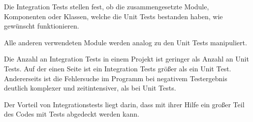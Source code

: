 
Die Integration Tests stellen fest, ob die zusammengesetzte Module, Komponenten oder Klassen, welche die Unit Tests bestanden haben, wie gewünscht funktionieren.

Alle anderen verwendeten Module werden analog zu den Unit Tests manipuliert.

Die Anzahl an Integration Tests in einem Projekt ist geringer als Anzahl an Unit Tests.
Auf der einen Seite ist ein Integration Tests größer als ein Unit Test. 
Andererseits ist die Fehlersuche im Programm bei negativem Testergebnis deutlich komplexer und zeitintensiver, 
als bei Unit Tests.

Der Vorteil von Integrationstests liegt darin, dass mit ihrer Hilfe ein großer Teil des Codes mit Tests abgedeckt werden kann.